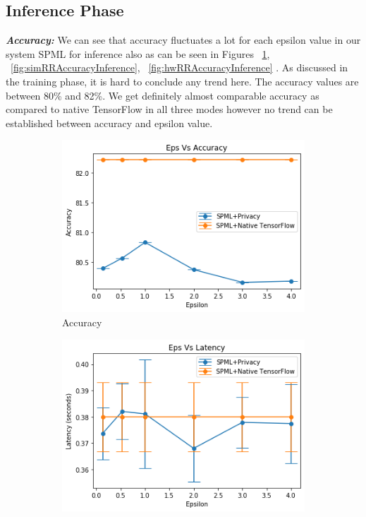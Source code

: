 \subsection{Inference Phase}
\textbf{\textit{Accuracy: }} We can see that accuracy fluctuates a lot for each epsilon value in our system SPML for inference also as can be seen in Figures ~\ref{fig:nativeRRAccuracyInference}, ~\ref{fig:simRRAccuracyInference}, ~\ref{fig:hwRRAccuracyInference} . As discussed in the training phase, it is hard to conclude any trend here. The accuracy values are between 80\% and 82\%. We get definitely almost comparable accuracy as compared to native TensorFlow in all three modes however no trend can be established between accuracy and epsilon value.
\begin{figure}
     \begin{subfigure}{0.5\textwidth}
         \includegraphics[width=\textwidth]{images/Inference/RRAccuracy.png}
         \caption{Accuracy}
         \label{fig:nativeRRAccuracyInference}
     \end{subfigure}
     \begin{subfigure}{0.5\textwidth}
         \includegraphics[width=\textwidth]{images/Inference/RRLatency.png}

\end{subfigure}
\end{figure}
